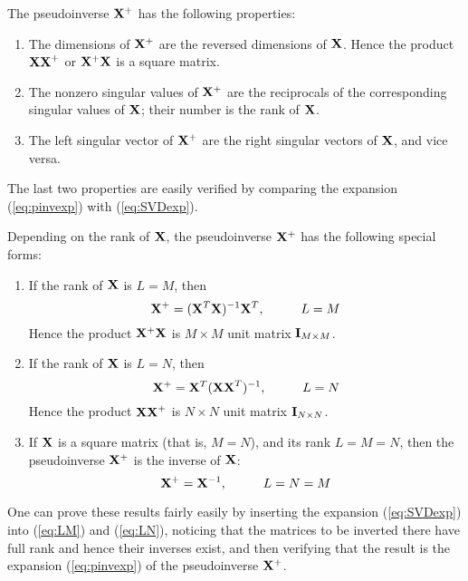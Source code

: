 \begin{enumerate}
\begin{solution}
    The pseudoinverse ${\bf X}^+$ has the following properties:
    \begin{enumerate}
    \item  The dimensions of ${\bf X}^+$ are the reversed dimensions of ${\bf X}$.
      Hence the product ${\bf XX}^+$ or ${\bf X}^+{\bf X}$ is a square matrix.
    \item The nonzero singular values of ${\bf X}^+$ are the reciprocals of the
      corresponding singular values of ${\bf X}$; their number is the rank of ${\bf X}$.
    \item The left singular vector of ${\bf X}^+$ are the right singular vectors of
      ${\bf X}$, and vice versa.
    \end{enumerate}
    The last two properties are easily verified by comparing the expansion
    (\ref{eq:pinvexp}) with (\ref{eq:SVDexp}).

    Depending on the rank of ${\bf X}$, the pseudoinverse ${\bf X}^+$ has the following
    special forms: 
    \begin{enumerate}
    \item If the rank of ${\bf X}$ is $L=M$, then
      \begin{equation}
        {\bf X}^+ = ({\bf X}^T{\bf X})^{-1}{\bf X}^T, \hspace{1cm} L=M
        \label{eq:LM}
      \end{equation}
      Hence the product ${\bf X}^+{\bf X}$ is $M \times M$ unit matrix ${\bf I}_{M \times M}$.
    \item If the rank of ${\bf X}$ is $L=N$, then
      \begin{equation}
        {\bf X}^+ = {\bf X}^T({\bf XX}^T)^{-1}, \hspace{1cm} L=N
        \label{eq:LN}
      \end{equation}
      Hence the product ${\bf XX}^+$ is $N \times N$ unit matrix ${\bf I}_{N \times N}$.
    \item If ${\bf X}$ is a square matrix (that is, $M=N$), and its rank $L=M=N$, then
      the pseudoinverse ${\bf X}^+$ is the inverse of ${\bf X}$:
      \begin{equation}
        {\bf X}^+ = {\bf X}^{-1}, \hspace{1cm} L=N=M
        \label{eq:LNM}
      \end{equation}
    \end{enumerate}
    One can prove these results fairly easily by inserting the expansion (\ref{eq:SVDexp})
    into (\ref{eq:LM}) and (\ref{eq:LN}), noticing that the matrices to be inverted there
    have full rank and hence their inverses exist, and then verifying that the result is
    the expansion (\ref{eq:pinvexp}) of the pseudoinverse ${\bf X}^+$.


\end{solution}
\end{enumerate}
